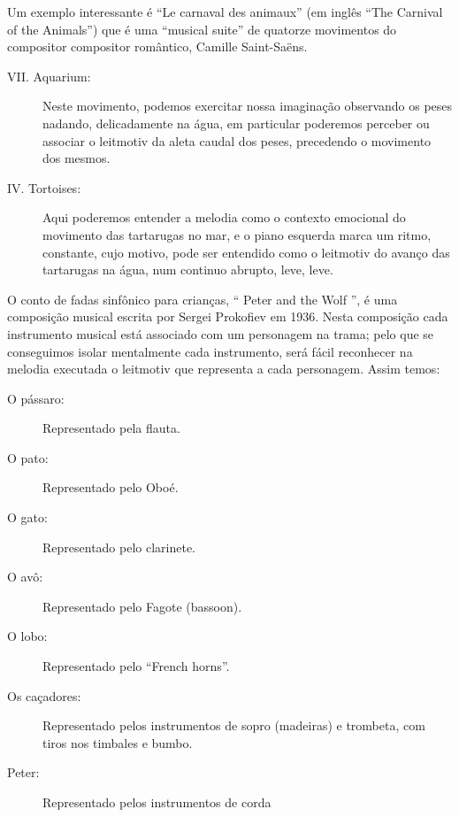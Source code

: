 \begin{example}
Um exemplo interessante é ``Le carnaval des animaux'' (em inglês ``The Carnival of the Animals'')
que é uma ``musical suite'' de quatorze movimentos do compositor compositor romântico, Camille Saint-Saëns. 
\begin{description}
\item[VII. Aquarium:] Neste movimento, podemos exercitar nossa imaginação observando os peses nadando,
delicadamente na água, em particular poderemos perceber ou associar o leitmotiv da aleta caudal dos peses, 
precedendo o movimento dos mesmos.

\item[IV. Tortoises:] Aqui poderemos entender a melodia como o contexto emocional do movimento das tartarugas no mar,
e  o piano esquerda marca um ritmo, constante, cujo motivo, pode ser entendido como o leitmotiv do avanço das tartarugas na água,
num continuo abrupto, leve, leve.

\end{description}

\end{example}

\begin{example}
O conto de fadas sinfônico para crianças, `` Peter and the Wolf '', 
é uma composição musical escrita por Sergei Prokofiev em 1936.
Nesta composição cada instrumento musical está associado com um personagem na trama;
pelo que se conseguimos isolar mentalmente cada instrumento, 
será fácil reconhecer na melodia executada o leitmotiv que representa a cada personagem.
Assim temos:
\begin{description}
\item[O pássaro:] Representado pela flauta.
\item[O pato:] Representado pelo Oboé.
\item[O gato:] Representado pelo clarinete.
\item[O avô:] Representado pelo Fagote (bassoon).
\item[O lobo:] Representado pelo ``French horns''.
\item[Os caçadores:] Representado pelos instrumentos de sopro (madeiras)
e trombeta, com tiros nos timbales e bumbo.
\item[Peter:] Representado pelos instrumentos de corda
\end{description}
\end{example}

